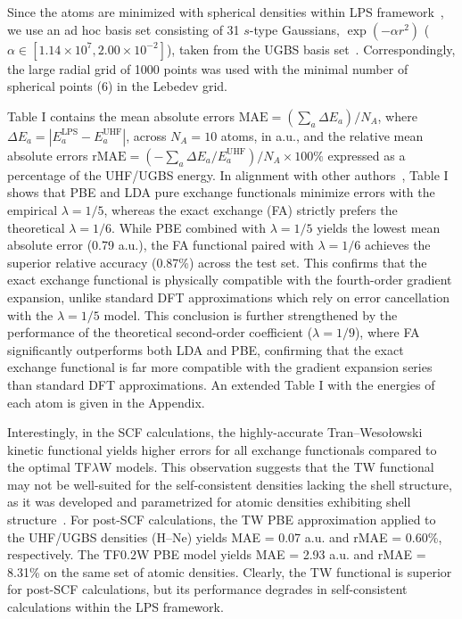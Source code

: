 \documentclass[%
 reprint,
 amsmath,amssymb,
 aps,
pra,
]{revtex4-2}
\begin{document}
Since the atoms are minimized with spherical densities within LPS framework~\cite{Chan.2001.JCP.114.631, Karasiev.2012.CPC.183.2519}, we use an ad hoc basis set consisting of 31 $s$-type Gaussians, $\exp(-\alpha r^2)$ ($\alpha\in [1.14\times10^7, 2.00\times10^{-2}]$), taken from the UGBS basis set~\cite{Castro.1998.JCP.108.5225,Pritchard.2019.JCIM.59.4814,Feller.1996.JCC.17.1571,Schuchardt.2007.JCIM.47.1045}. Correspondingly, the large radial grid of 1000 points was used with the minimal number of spherical points (6) in the Lebedev grid. 

Table I contains the mean absolute errors $\text{MAE}=\left( \sum_a\Delta E_a \right) /N_A$, where $\Delta E_a=|E_a^{\text{LPS}}-E_a^{\text{UHF}}|$, across $N_A=10$ atoms, in a.u., and the relative mean absolute errors $\text{rMAE}=\left( -\sum_a\Delta E_a/E_a^{\text{UHF}}\right)/N_A\times100\%$ expressed as a percentage of the UHF/UGBS energy. 
In alignment with other authors~\cite{Chan.2001.JCP.114.631, Karasiev.2012.CPC.183.2519}, Table I shows that PBE and LDA pure exchange functionals minimize errors with the empirical $\lambda=1/5$, whereas the exact exchange (FA) strictly prefers the theoretical $\lambda=1/6$. While PBE combined with $\lambda=1/5$ yields the lowest mean absolute error (0.79 a.u.), the FA functional paired with $\lambda=1/6$ achieves the superior relative accuracy (0.87\%) across the test set. This confirms that the exact exchange functional is physically compatible with the fourth-order gradient expansion, unlike standard DFT approximations which rely on error cancellation with the $\lambda=1/5$ model. This conclusion is further strengthened by the performance of the theoretical second-order coefficient ($\lambda=1/9$), where FA significantly outperforms both LDA and PBE, confirming that the exact exchange functional is far more compatible with the gradient expansion series than standard DFT approximations. An extended Table I with the energies of each atom is given in the Appendix.

Interestingly, in the SCF calculations, the highly-accurate Tran--Wesołowski kinetic functional yields higher errors for all exchange functionals compared to the optimal TF$\lambda$W models. This observation suggests that the TW functional may not be well-suited for the self-consistent densities lacking the shell structure, as it was developed and parametrized for atomic densities exhibiting shell structure~\cite{Tran.2002.IJQC.89.441}. For post-SCF calculations, the TW PBE approximation applied to the UHF/UGBS densities (H--Ne) yields MAE = 0.07 a.u. and rMAE = 0.60\%, respectively. The TF$0.2$W PBE model yields MAE = 2.93 a.u. and rMAE = 8.31\% on the same set of atomic densities. Clearly, the TW functional is superior for post-SCF calculations, but its performance degrades in self-consistent calculations within the LPS framework.
\end{document}

